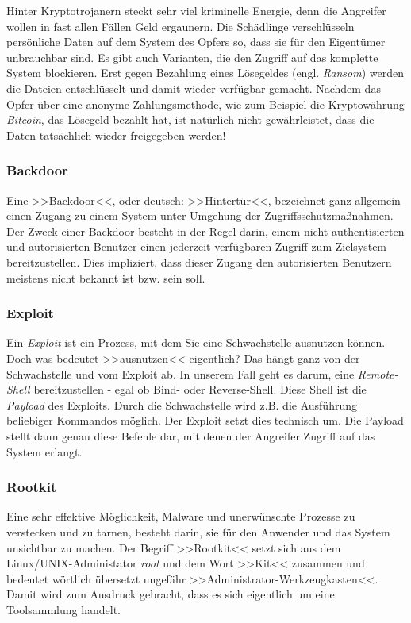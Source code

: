 Hinter Kryptotrojanern steckt sehr viel kriminelle Energie, denn die Angreifer wollen in fast allen Fällen Geld ergaunern. Die Schädlinge verschlüsseln persönliche Daten auf dem System des Opfers so, dass sie für den Eigentümer unbrauchbar sind. Es gibt auch Varianten, die den Zugriff auf das komplette System blockieren. Erst gegen Bezahlung eines Lösegeldes (engl. \textit{Ransom}) werden die Dateien entschlüsselt und damit wieder verfügbar gemacht. Nachdem das Opfer über eine anonyme Zahlungsmethode, wie zum Beispiel die Kryptowährung \textit{Bitcoin}, das Lösegeld bezahlt hat, ist natürlich nicht gewährleistet, dass die Daten tatsächlich wieder freigegeben werden!

\subsubsection{Backdoor}
\label{sec:Backdoor}

Eine >>Backdoor<<, oder deutsch: >>Hintertür<<, bezeichnet ganz allgemein einen Zugang zu einem System unter Umgehung der Zugriffsschutzmaßnahmen. Der Zweck einer Backdoor besteht in der Regel darin, einem nicht authentisierten und autorisierten Benutzer einen jederzeit verfügbaren Zugriff zum Zielsystem bereitzustellen. Dies impliziert, dass dieser Zugang den autorisierten Benutzern meistens nicht bekannt ist bzw. sein soll.


\subsubsection{Exploit}
\label{sec:Exploit}

Ein \textit{Exploit} ist ein Prozess, mit dem Sie eine Schwachstelle ausnutzen können. Doch was bedeutet >>ausnutzen<< eigentlich? Das hängt ganz von der Schwachstelle und vom Exploit ab. In unserem Fall geht es darum, eine \textit{Remote-Shell} bereitzustellen - egal ob Bind- oder Reverse-Shell. Diese Shell ist die \textit{Payload} des Exploits. Durch die Schwachstelle wird z.B. die Ausführung beliebiger Kommandos möglich. Der Exploit setzt dies technisch um. Die Payload stellt dann genau diese Befehle dar, mit denen der Angreifer Zugriff auf das System erlangt.

\subsubsection{Rootkit}
\label{sec:Rootkit}

Eine sehr effektive Möglichkeit, Malware und unerwünschte Prozesse zu verstecken und zu tarnen, besteht darin, sie für den Anwender und das System unsichtbar zu machen. Der Begriff >>Rootkit<< setzt sich aus dem Linux/UNIX-Administator \textit{root} und dem Wort >>Kit<< zusammen und bedeutet wörtlich übersetzt ungefähr >>Administrator-Werkzeugkasten<<. Damit wird zum Ausdruck gebracht, dass es sich eigentlich um eine Toolsammlung handelt.

